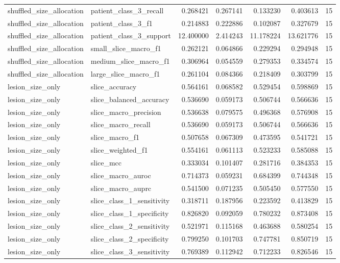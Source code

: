 \begin{tabular}{llrrrrr}
shuffled_size_allocation & patient_class_3_recall & 0.268421 & 0.267141 & 0.133230 & 0.403613 & 15 \\
shuffled_size_allocation & patient_class_3_f1 & 0.214883 & 0.222886 & 0.102087 & 0.327679 & 15 \\
shuffled_size_allocation & patient_class_3_support & 12.400000 & 2.414243 & 11.178224 & 13.621776 & 15 \\
shuffled_size_allocation & small_slice_macro_f1 & 0.262121 & 0.064866 & 0.229294 & 0.294948 & 15 \\
shuffled_size_allocation & medium_slice_macro_f1 & 0.306964 & 0.054559 & 0.279353 & 0.334574 & 15 \\
shuffled_size_allocation & large_slice_macro_f1 & 0.261104 & 0.084366 & 0.218409 & 0.303799 & 15 \\
lesion_size_only & slice_accuracy & 0.564161 & 0.068582 & 0.529454 & 0.598869 & 15 \\
lesion_size_only & slice_balanced_accuracy & 0.536690 & 0.059173 & 0.506744 & 0.566636 & 15 \\
lesion_size_only & slice_macro_precision & 0.536638 & 0.079575 & 0.496368 & 0.576908 & 15 \\
lesion_size_only & slice_macro_recall & 0.536690 & 0.059173 & 0.506744 & 0.566636 & 15 \\
lesion_size_only & slice_macro_f1 & 0.507658 & 0.067309 & 0.473595 & 0.541721 & 15 \\
lesion_size_only & slice_weighted_f1 & 0.554161 & 0.061113 & 0.523233 & 0.585088 & 15 \\
lesion_size_only & slice_mcc & 0.333034 & 0.101407 & 0.281716 & 0.384353 & 15 \\
lesion_size_only & slice_macro_auroc & 0.714373 & 0.059231 & 0.684399 & 0.744348 & 15 \\
lesion_size_only & slice_macro_auprc & 0.541500 & 0.071235 & 0.505450 & 0.577550 & 15 \\
lesion_size_only & slice_class_1_sensitivity & 0.318711 & 0.187956 & 0.223592 & 0.413829 & 15 \\
lesion_size_only & slice_class_1_specificity & 0.826820 & 0.092059 & 0.780232 & 0.873408 & 15 \\
lesion_size_only & slice_class_2_sensitivity & 0.521971 & 0.115168 & 0.463688 & 0.580254 & 15 \\
lesion_size_only & slice_class_2_specificity & 0.799250 & 0.101703 & 0.747781 & 0.850719 & 15 \\
lesion_size_only & slice_class_3_sensitivity & 0.769389 & 0.112942 & 0.712233 & 0.826546 & 15 \\

\end{tabular}
